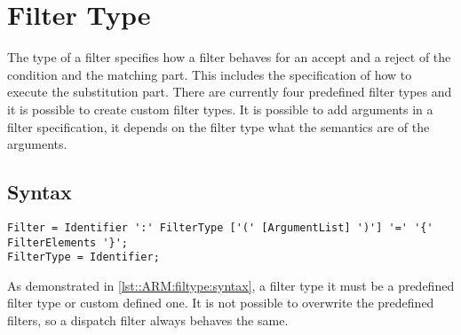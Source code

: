 \chapter{Filter Type} \label{chapter:filtertype}
The type of a filter specifies how a filter behaves for an accept and a reject of the condition and the matching part.
This includes the specification of how to execute the substitution part.
There are currently four predefined filter types and it is possible to create custom filter types.
It is possible to add arguments in a filter specification, it depends on the filter type what the semantics
are of the arguments.

\section*{Syntax}
\begin{lstlisting}[caption = {Filter type syntax}, label = lst::ARM:filtype:syntax,
style = listing, language = ebnf, float = tpb]
Filter = Identifier ':' FilterType ['(' [ArgumentList] ')'] '=' '{' FilterElements '}';
FilterType = Identifier;
\end{lstlisting}
As demonstrated in \autoref{lst::ARM:filtype:syntax}, a filter type it must be a predefined filter type or custom defined one. It is not possible
to overwrite the predefined filters, so a dispatch filter always behaves the same.

